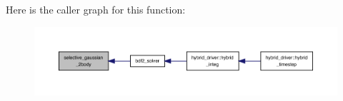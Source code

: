 Here is the caller graph for this function\+:
\nopagebreak
\begin{figure}[H]
\begin{center}
\leavevmode
\includegraphics[width=350pt]{bdf2__solver_8f90_a8dbb8aa5a5523ba3d3eab9c0a85cd089_icgraph}
\end{center}
\end{figure}
